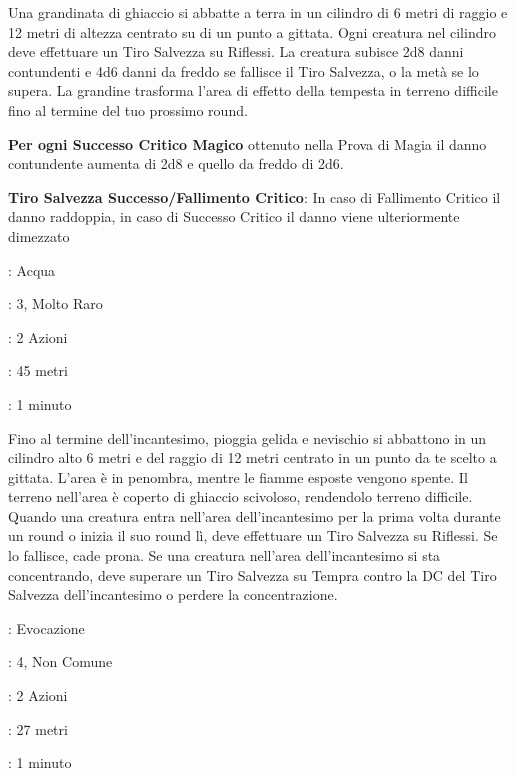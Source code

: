 \begin{multicols}{2}
Una grandinata di ghiaccio si abbatte a terra in un cilindro di 6 metri di raggio e 12 metri di altezza centrato su di un punto a gittata. Ogni creatura nel cilindro deve effettuare un Tiro Salvezza su Riflessi. La creatura subisce 2d8 danni contundenti e 4d6 danni da freddo se fallisce il Tiro Salvezza, o la metà se lo supera. La grandine trasforma l'area di effetto della tempesta in terreno difficile fino al termine del tuo prossimo round.

\textbf{Per ogni Successo Critico Magico} ottenuto nella Prova di Magia il danno contundente aumenta di 2d8 e quello da freddo di 2d6.

\textbf{Tiro Salvezza Successo/Fallimento Critico}: In caso di Fallimento Critico il danno raddoppia, in caso di Successo Critico il danno viene ulteriormente dimezzato

\noindent\colorbox{OBSSgold!10}{
\begin{minipage}{0.95\linewidth}
\begin{description}[noitemsep, topsep=0pt, parsep=0pt, partopsep=0pt, leftmargin=0cm, labelwidth=1.3cm]
	\item[\textbf{Lista}]: Acqua
	\item[\textbf{Livello}]: 3, Molto Raro
	\item[\textbf{Lancio}]: 2 Azioni
	\item[\textbf{Gittata}]: 45 metri
	\item[\textbf{Durata}]: 1 minuto
\end{description}
\end{minipage}}\smallskip

Fino al termine dell'incantesimo, pioggia gelida e nevischio si abbattono in un cilindro alto 6 metri e del raggio di 12 metri centrato in un punto da te scelto a gittata. L'area è in penombra, mentre le fiamme esposte vengono spente. Il terreno nell'area è coperto di ghiaccio scivoloso, rendendolo terreno difficile. Quando una creatura entra nell'area dell'incantesimo per la prima volta durante un round o inizia il suo round lì, deve effettuare un Tiro Salvezza su Riflessi. Se lo fallisce, cade prona. Se una creatura nell'area dell'incantesimo si sta concentrando, deve superare un Tiro Salvezza su Tempra contro la DC del Tiro Salvezza dell'incantesimo o perdere la concentrazione.

\noindent\colorbox{OBSSgold!10}{
\begin{minipage}{0.95\linewidth}
\begin{description}[noitemsep, topsep=0pt, parsep=0pt, partopsep=0pt, leftmargin=0cm, labelwidth=1.3cm]
	\item[\textbf{Lista}]: Evocazione
	\item[\textbf{Livello}]: 4, Non Comune
	\item[\textbf{Lancio}]: 2 Azioni
	\item[\textbf{Gittata}]: 27 metri
	\item[\textbf{Durata}]: 1 minuto
\end{description}
\end{minipage}}\smallskip


\end{multicols}
